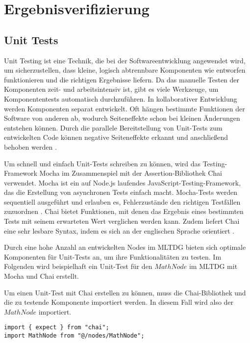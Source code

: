 
\chapter{Ergebnisverifizierung}

\section{Unit Tests}

Unit Testing ist eine Technik, die bei der Softwareentwicklung angewendet wird, um sicherzustellen, dass kleine, logisch abtrennbare Komponenten wie entworfen funktionieren und die richtigen Ergebnisse liefern. Da das manuelle Testen der Komponenten zeit- und arbeitsintensiv ist, gibt es viele Werkzeuge, um Komponententests automatisch durchzuführen. In kollaborativer Entwicklung werden Komponenten separat entwickelt. Oft hängen bestimmte Funktionen der Software von anderen ab, wodurch Seiteneffekte schon bei kleinen Änderungen entstehen können. Durch die parallele Bereitstellung von Unit-Tests zum entwickelten Code können negative Seiteneffekte erkannt und anschließend behoben werden \cite{Dalton2018}.

Um schnell und einfach Unit-Tests schreiben zu können, wird das Testing-Framework Mocha im Zusammenspiel mit der Assertion-Bibliothek Chai verwendet. Mocha ist ein auf Node.js laufendes JavaScript-Testing-Framework, das die Erstellung von asynchronen Tests einfach macht. Mocha-Tests werden sequentiell ausgeführt und erlauben es, Fehlerzustände den richtigen Testfällen zuzuordnen \cite{mocha}. Chai bietet Funktionen, mit denen das Ergebnis eines bestimmten Tests mit seinem erwarteten Wert verglichen werden kann. Zudem liefert Chai eine sehr lesbare Syntax, indem es sich an der englischen Sprache orientiert \cite{chai}.

Durch eine hohe Anzahl an entwickelten Nodes im \ac{MLTDG} bieten sich optimale Komponenten für Unit-Tests an, um ihre Funktionalitäten zu testen. Im Folgenden wird beispielhaft ein Unit-Test für den $MathNode$ im \ac{MLTDG} mit Mocha und Chai erstellt.

Um einen Unit-Test mit Chai erstellen zu können, muss die Chai-Bibliothek und die zu testende Komponente importiert werden. In diesem Fall wird also der $MathNode$ importiert.

\begin{lstlisting}[caption=Unit-Test: Import,label=unit1]
import { expect } from "chai";
import MathNode from "@/nodes/MathNode";
\end{lstlisting}


